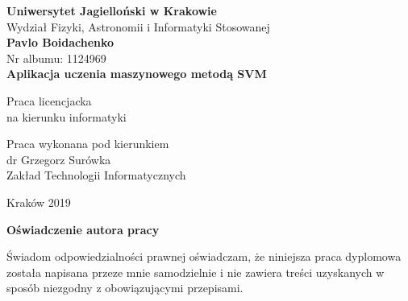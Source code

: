 \documentclass[paper=a4, fontsize=11pt]{scrartcl} %
\def \thesis {Aplikacja uczenia maszynowego metodą SVM}
\def \author {Pavlo Boidachenko}
\def \department {Wydział Fizyki, Astronomii i Informatyki Stosowanej}
\numberwithin{equation}{section} %
\numberwithin{figure}{section} %
\begin{document}
\thispagestyle{empty}
\begin{titlepage}
    \begin{center}
        \Large \textbf{Uniwersytet Jagielloński w Krakowie}\vspace{0.2cm}\\ \department\\
        \vspace*{1cm} 
        \vspace{3cm}
        \Large
        \textbf{\author}\\\vspace{0.5cm}
        \normalsize Nr albumu: 1124969\\
        \vspace{2cm}
        \Huge
        \textbf{\thesis}

        \vspace{1.5cm}
        \normalsize
        Praca licencjacka\\
        na kierunku informatyki\\ \vspace{0.15cm}
        \vfill
        \vspace{2cm}
        \begin{minipage}{1\textwidth}
            \begin{flushright}
                Praca wykonana pod kierunkiem\\
                dr Grzegorz Surówka\\
                Zakład Technologii Informatycznych 
            \end{flushright}
        \end{minipage}
        \vspace{2cm}
        \begin{center}
            Kraków 2019
        \end{center}
    \end{center}

\end{titlepage}

\newpage 
 \thispagestyle{empty}
\vspace{2.5cm}
\begin{flushleft}
\large \textbf{Oświadczenie autora pracy}\vspace{0.6cm}\\
\end{flushleft}

\noindent Świadom odpowiedzialności prawnej oświadczam, że niniejsza praca dyplomowa została napisana przeze mnie samodzielnie i nie zawiera treści uzyskanych w sposób niezgodny z obowiązującymi przepisami.\\
\end{document}
